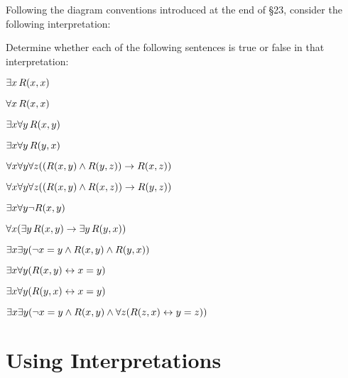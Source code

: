 \problempart
\label{pr.TorF3}
Following the diagram conventions introduced at the end of \S23, consider the following interpretation:	
\begin{center}
\end{center}
Determine whether each of the following sentences is true or false in that interpretation:
\begin{earg}
\item $\exists x\,\mathord{R}(x,x)$ \hfill {}
\item $\forall x\,\mathord{R}(x,x)$ \hfill {}
\item $\exists x \forall y\,\mathord{R}(x,y)$ \hfill {}
\item $\exists x \forall y\,\mathord{R}(y,x)$ \hfill {}
\item $\forall x \forall y \forall z ((\mathord{R}(x,y) \wedge \mathord{R}(y,z)) \rightarrow \mathord{R}(x,z))$ \hfill {}
\item $\forall x \forall y \forall z ((\mathord{R}(x,y) \wedge \mathord{R}(x,z)) \rightarrow \mathord{R}(y,z))$ \hfill {}
\item $\exists x \forall y \neg \mathord{R}(x,y)$ \hfill {}
\item $\forall x(\exists y\,\mathord{R}(x,y) \rightarrow \exists y\,\mathord{R}(y,x))$ \hfill {}
\item $\exists x \exists y (\neg x = y \wedge \mathord{R}(x,y) \wedge \mathord{R}(y,x))$ \hfill {}
\item $\exists x \forall y(\mathord{R}(x,y) \leftrightarrow x = y)$ \hfill {}
\item $\exists x \forall y(\mathord{R}(y,x) \leftrightarrow x = y)$ \hfill {}
\item $\exists x \exists y(\neg x = y \wedge \mathord{R}(x,y) \wedge \forall z(\mathord{R}(z,x) \leftrightarrow y = z))$ \hfill {}
\end{earg}

\setcounter{chapter}{29}
\chapter{Using Interpretations}\setcounter{ProbPart}{0}

